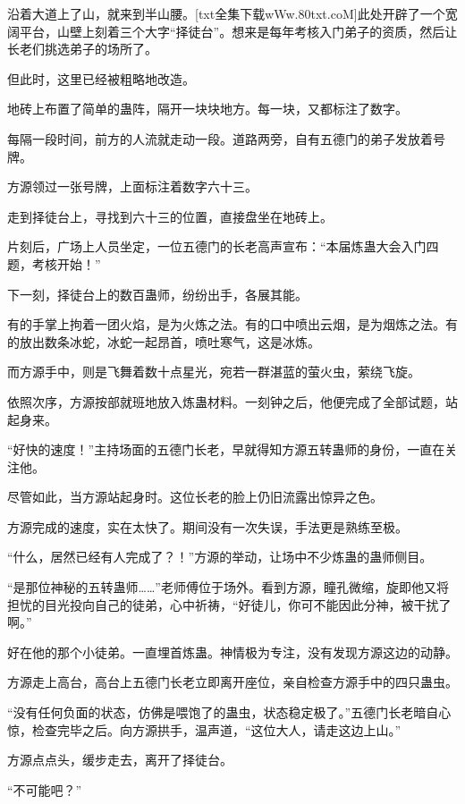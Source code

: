 
\begin{this_body}

沿着大道上了山，就来到半山腰。[txt全集下载wWw.80txt.coM]此处开辟了一个宽阔平台，山壁上刻着三个大字“择徒台”。想来是每年考核入门弟子的资质，然后让长老们挑选弟子的场所了。

但此时，这里已经被粗略地改造。

地砖上布置了简单的蛊阵，隔开一块块地方。每一块，又都标注了数字。

每隔一段时间，前方的人流就走动一段。道路两旁，自有五德门的弟子发放着号牌。

方源领过一张号牌，上面标注着数字六十三。

走到择徒台上，寻找到六十三的位置，直接盘坐在地砖上。

片刻后，广场上人员坐定，一位五德门的长老高声宣布：“本届炼蛊大会入门四题，考核开始！”

下一刻，择徒台上的数百蛊师，纷纷出手，各展其能。

有的手掌上拘着一团火焰，是为火炼之法。有的口中喷出云烟，是为烟炼之法。有的放出数条冰蛇，冰蛇一起昂首，喷吐寒气，这是冰炼。

而方源手中，则是飞舞着数十点星光，宛若一群湛蓝的萤火虫，萦绕飞旋。

依照次序，方源按部就班地放入炼蛊材料。一刻钟之后，他便完成了全部试题，站起身来。

“好快的速度！”主持场面的五德门长老，早就得知方源五转蛊师的身份，一直在关注他。

尽管如此，当方源站起身时。这位长老的脸上仍旧流露出惊异之色。

方源完成的速度，实在太快了。期间没有一次失误，手法更是熟练至极。

“什么，居然已经有人完成了？！”方源的举动，让场中不少炼蛊的蛊师侧目。

“是那位神秘的五转蛊师……”老师傅位于场外。看到方源，瞳孔微缩，旋即他又将担忧的目光投向自己的徒弟，心中祈祷，“好徒儿，你可不能因此分神，被干扰了啊。”

好在他的那个小徒弟。一直埋首炼蛊。神情极为专注，没有发现方源这边的动静。

方源走上高台，高台上五德门长老立即离开座位，亲自检查方源手中的四只蛊虫。

“没有任何负面的状态，仿佛是喂饱了的蛊虫，状态稳定极了。”五德门长老暗自心惊，检查完毕之后。向方源拱手，温声道，“这位大人，请走这边上山。”

方源点点头，缓步走去，离开了择徒台。

“不可能吧？”


\end{this_body}
